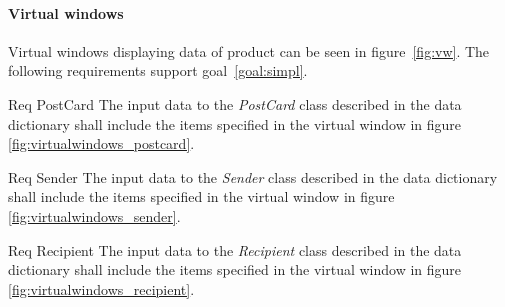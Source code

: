 \documentclass[10pt,a4paper]{article}
\begin{document}
\paragraph{Virtual windows}
Virtual windows displaying data of product can be seen in figure~\ref{fig:vw}. The following requirements support goal~\ref{goal:simpl}.

\begin {description}
	\item [Req \thesubsubsection {.\thedata} PostCard] The input data to the \textit{PostCard} class described in the data dictionary shall include the items specified in the virtual window in figure \ref{fig:virtualwindows_postcard}.

	\item [Req \thesubsubsection {.\thedata} Sender] The input data to the \textit{Sender} class described in the data dictionary shall include the items specified in the virtual window in figure \ref{fig:virtualwindows_sender}.

	\item [Req \thesubsubsection {.\thedata} Recipient] The input data to the \textit{Recipient} class described in the data dictionary shall include the items specified in the virtual window in figure \ref{fig:virtualwindows_recipient}.

\end{description}
\hfill
\end{document}
